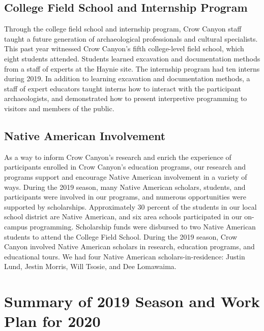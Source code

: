 \documentclass[
  12pt,
]{krantz}
\begin{document}
\hypertarget{college-field-school-and-internship-program}{%
\section{College Field School and Internship Program}\label{college-field-school-and-internship-program}}

Through the college field school and internship program, Crow Canyon
staff taught a future generation of archaeological professionals and
cultural specialists. This past year witnessed Crow Canyon's fifth
college-level field school, which eight students attended. Students
learned excavation and documentation methods from a staff of experts at
the Haynie site. The internship program had ten interns during 2019. In
addition to learning excavation and documentation methods, a staff of
expert educators taught interns how to interact with the participant
archaeologists, and demonstrated how to present interpretive programming
to visitors and members of the public.

\hypertarget{native-american-involvement}{%
\section{Native American Involvement}\label{native-american-involvement}}

As a way to inform Crow Canyon's research and enrich the experience of
participants enrolled in Crow Canyon's education programs, our research
and programs support and encourage Native American involvement in a
variety of ways. During the 2019 season, many Native American scholars,
students, and participants were involved in our programs, and numerous
opportunities were supported by scholarships. Approximately 30 percent
of the students in our local school district are Native American, and
six area schools participated in our on-campus programming. Scholarship
funds were disbursed to two Native American students to attend the
College Field School. During the 2019 season, Crow Canyon involved
Native American scholars in research, education programs, and
educational tours. We had four Native American scholars-in-residence:
Justin Lund, Jestin Morris, Will Tsosie, and Dee Lomawaima.

\hypertarget{summary-of-2019-season-and-work-plan-for-2020}{%
\chapter{Summary of 2019 Season and Work Plan for 2020}\label{summary-of-2019-season-and-work-plan-for-2020}}
\end{document}
